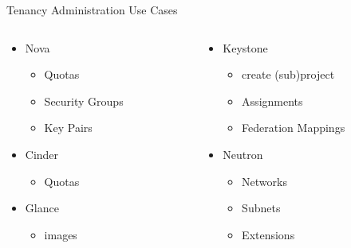 \documentclass{beamer}
\begin{document}
\begin{frame}{Tenancy Administration Use Cases}
  \begin{columns}[t,onlytextwidth]

    \begin{column}{.5\textwidth}
      \begin{itemize}
      \item Nova
        \begin{itemize}
        \item Quotas
        \item Security Groups
        \item Key Pairs
        \end{itemize}
      \item Cinder
        \begin{itemize}
        \item Quotas
        \end{itemize}
      \item Glance
        \begin{itemize}
        \item images
        \end{itemize}
      \end{itemize}
    \end{column}

    \begin{column}{.5\textwidth}
      \begin{itemize}
      \item Keystone
        \begin{itemize}
        \item create (sub)project
        \item Assignments
        \item Federation Mappings          
        \end{itemize}

      \item Neutron
        \begin{itemize}
        \item Networks
        \item Subnets
        \item Extensions
        \end{itemize}
      \end{itemize}
    \end{column}
  \end{columns}
\end{frame}
\end{document}
